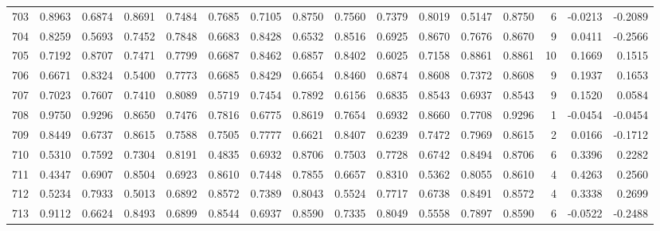 \begin{tabular}{lrrrrrrrrrrrrrrr}
703 &      0.8963 &  0.6874 &  0.8691 &  0.7484 &  0.7685 &  0.7105 &  0.8750 &  0.7560 &  0.7379 &  0.8019 &   0.5147 &     0.8750 &      6 &                   -0.0213 &                    -0.2089 \\
704 &      0.8259 &  0.5693 &  0.7452 &  0.7848 &  0.6683 &  0.8428 &  0.6532 &  0.8516 &  0.6925 &  0.8670 &   0.7676 &     0.8670 &      9 &                    0.0411 &                    -0.2566 \\
705 &      0.7192 &  0.8707 &  0.7471 &  0.7799 &  0.6687 &  0.8462 &  0.6857 &  0.8402 &  0.6025 &  0.7158 &   0.8861 &     0.8861 &     10 &                    0.1669 &                     0.1515 \\
706 &      0.6671 &  0.8324 &  0.5400 &  0.7773 &  0.6685 &  0.8429 &  0.6654 &  0.8460 &  0.6874 &  0.8608 &   0.7372 &     0.8608 &      9 &                    0.1937 &                     0.1653 \\
707 &      0.7023 &  0.7607 &  0.7410 &  0.8089 &  0.5719 &  0.7454 &  0.7892 &  0.6156 &  0.6835 &  0.8543 &   0.6937 &     0.8543 &      9 &                    0.1520 &                     0.0584 \\
708 &      0.9750 &  0.9296 &  0.8650 &  0.7476 &  0.7816 &  0.6775 &  0.8619 &  0.7654 &  0.6932 &  0.8660 &   0.7708 &     0.9296 &      1 &                   -0.0454 &                    -0.0454 \\
709 &      0.8449 &  0.6737 &  0.8615 &  0.7588 &  0.7505 &  0.7777 &  0.6621 &  0.8407 &  0.6239 &  0.7472 &   0.7969 &     0.8615 &      2 &                    0.0166 &                    -0.1712 \\
710 &      0.5310 &  0.7592 &  0.7304 &  0.8191 &  0.4835 &  0.6932 &  0.8706 &  0.7503 &  0.7728 &  0.6742 &   0.8494 &     0.8706 &      6 &                    0.3396 &                     0.2282 \\
711 &      0.4347 &  0.6907 &  0.8504 &  0.6923 &  0.8610 &  0.7448 &  0.7855 &  0.6657 &  0.8310 &  0.5362 &   0.8055 &     0.8610 &      4 &                    0.4263 &                     0.2560 \\
712 &      0.5234 &  0.7933 &  0.5013 &  0.6892 &  0.8572 &  0.7389 &  0.8043 &  0.5524 &  0.7717 &  0.6738 &   0.8491 &     0.8572 &      4 &                    0.3338 &                     0.2699 \\
713 &      0.9112 &  0.6624 &  0.8493 &  0.6899 &  0.8544 &  0.6937 &  0.8590 &  0.7335 &  0.8049 &  0.5558 &   0.7897 &     0.8590 &      6 &                   -0.0522 &                    -0.2488 \\

\end{tabular}
